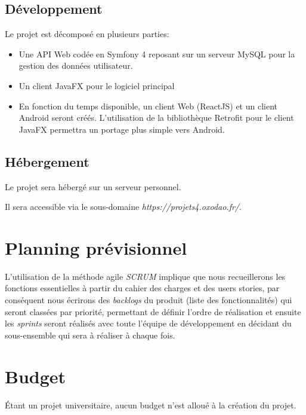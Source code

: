 \documentclass[oneside]{report}
\begin{document}
	\section{Développement}
	{
		\par Le projet est décomposé en plusieurs parties:
		\begin{itemize}
			\item \par Une API Web codée en Symfony 4 reposant sur un serveur MySQL pour la gestion des données utilisateur.\\
			\item \par Un client JavaFX pour le logiciel principal\\
			\item \par En fonction du temps disponible, un client Web (ReactJS) et un client Android seront créés. L'utilisation de la bibliothèque Retrofit pour le client JavaFX permettra un portage plus simple vers Android.
		\end{itemize}
	}

	\section{Hébergement}
	{
		\par Le projet sera hébergé sur un serveur personnel.
		\par Il sera accessible via le sous-domaine \textit{https://projets4.oxodao.fr/}.
	}

	\chapter{Planning prévisionnel}
	\par L'utilisation de la méthode agile \textit{SCRUM} implique que nous recueillerons les fonctions essentielles à partir du cahier des charges et des users stories, par conséquent nous écrirons des \textit{backlogs} du produit (liste des fonctionnalités) qui seront classées par priorité, permettant de définir l'ordre de réalisation et ensuite les \textit{sprints} seront réalisés avec toute l'équipe de développement en décidant du sous-ensemble qui sera à réaliser à chaque fois.

	\chapter{Budget}
	\par Étant un projet universitaire, aucun budget n'est alloué à la création du projet.
\end{document}
